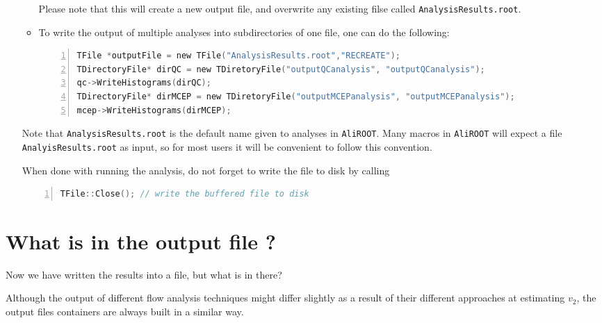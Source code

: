 \documentclass[a4paper]{book}
\numberwithin{equation}{subsection}
\begin{document}
\begin{enumerate}
\begin{itemize}
Please note that this will create a new output file, and overwrite any existing filse called \texttt{AnalysisResults.root}.

\item  To write the output of multiple analyses into subdirectories of one file, one can do the following:
\begin{lstlisting}[language=C, numbers=left]
TFile *outputFile = new TFile("AnalysisResults.root","RECREATE");
TDirectoryFile* dirQC = new TDiretoryFile("outputQCanalysis", "outputQCanalysis");
qc->WriteHistograms(dirQC);
TDirectoryFile* dirMCEP = new TDiretoryFile("outputMCEPanalysis", "outputMCEPanalysis");
mcep->WriteHistograms(dirMCEP);
\end{lstlisting}
\end{itemize}

Note that \texttt{AnalysisResults.root}  is the default name given to analyses in \texttt{AliROOT}. Many macros in \texttt{AliROOT} will expect a file \texttt{AnalyisResults.root} as input, so for most users it will be convenient to follow this convention.

When done with running the analysis, do not forget to write the file to disk by calling
\begin{lstlisting}[language=C, numbers=left]
TFile::Close();	// write the buffered file to disk \end{lstlisting}
\end{enumerate}

\section{What is in the output file ?}
 Now we have written the results into a file, but what is in there? 

Although the output of different flow analysis techniques might differ slightly as a result of their different approaches at estimating $v_2$, the output files containers are always built in a similar way. 
\end{document}
